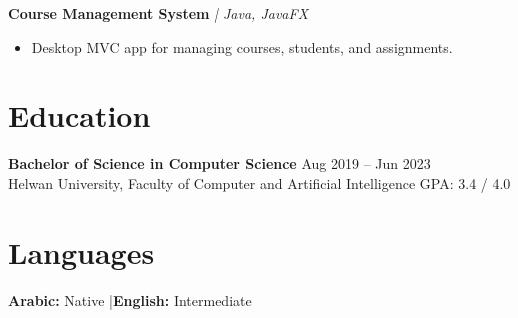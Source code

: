 \documentclass[10pt, letterpaper]{article}
\newcommand{\cvproject}[2]{%
  \textbf{#1} \textit{| #2}%
}
\begin{document}
\cvproject{Course Management System}{Java, JavaFX}
\begin{itemize}
  \item Desktop MVC app for managing courses, students, and assignments.
\end{itemize}

\section{Education}

\textbf{Bachelor of Science in Computer Science} \hfill Aug 2019 -- Jun 2023 \\
Helwan University, Faculty of Computer and Artificial Intelligence \hfill GPA: 3.4 / 4.0

\section{Languages}
\textbf{Arabic:} Native \quad|\quad \textbf{English:} Intermediate
\end{document}
